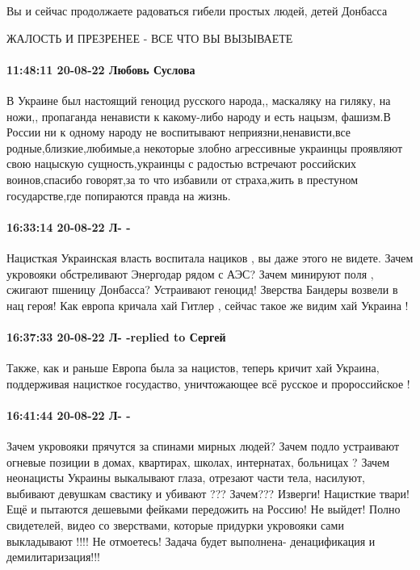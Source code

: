 Вы и сейчас продолжаете радоваться гибели простых людей, детей Донбасса

ЖАЛОСТЬ И ПРЕЗРЕНЕЕ - ВСЕ ЧТО ВЫ ВЫЗЫВАЕТЕ

\paragraph{11:48:11 20-08-22 Любовь Суслова}

В Украине был настоящий геноцид русского народа,, маскаляку на гиляку, на
ножи,, пропаганда ненависти к какому-либо народу и есть нацызм, фашизм.В России
ни к одному народу не воспитывают неприязни,ненависти,все
родные,близкие,любимые,а некоторые злобно агрессивные украинцы проявляют свою
нацыскую сущность,украинцы с радостью встречают российских воинов,спасибо
говорят,за то что избавили от страха,жить в престуном государстве,где
попираются правда на жизнь.

\paragraph{16:33:14 20-08-22 Л- -}

Нацисткая Украинская власть воспитала нациков , вы даже этого не видете.
Зачем укровояки обстреливают Энергодар рядом с АЭС? Зачем минируют поля , сжигают пшеницу Донбасса?
Устраивают геноцид! Зверства Бандеры возвели в нац героя!
Как европа кричала хай Гитлер , сейчас такое же видим хай Украина !

\paragraph{16:37:33 20-08-22 Л- -replied to Сергей}

Также, как и раньше Европа была за нацистов, теперь кричит хай Украина,
поддерживая нацисткое госудаство, уничтожающее всё русское и пророссийское !

\paragraph{16:41:44 20-08-22 Л- -}

Зачем укровояки прячутся за спинами мирных людей? Зачем подло устраивают огневые позиции в домах, квартирах, школах, интернатах, больницах ? Зачем неонацисты Украины выкалывают глаза, отрезают части тела, насилуют, выбивают девушкам свастику и убивают ???
Зачем???
Изверги! Нацисткие твари! Ещё и пытаются дешевыми фейками передожить на Россию! Не выйдет!
Полно свидетелей, видео со зверствами, которые придурки укровояки сами выкладывают !!!!
Не отмоетесь!
Задача будет выполнена- денацификация и демилитаризация!!!

